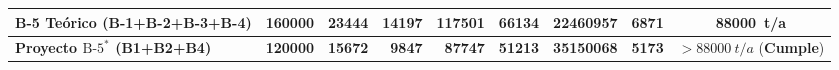 \documentclass{report}
\begin{document}
\begin{table}[H]
{\begin{tabular}{l r r r r r r r c}
            B-5 Teórico (B-1+B-2+B-3+B-4)         & \num{160000}           & \num{23444}           & \num{14197}                 & \num{117501}               & \num{66134}                  & \num{22460957}                   & \num{6871}               & \SI{88000}{t/a}                  \\
            \midrule
            \textbf{Proyecto $\text{B-5}^*$ (B1+B2+B4)} & \textbf{\num{120000}} & \textbf{\num{15672}} & \textbf{\num{9847}}         & \textbf{\num{87747}}       & \textbf{\num{51213}}         & \textbf{\num{35150068}}          & \textbf{\num{5173}}      & $> \SI{88000}{t/a}$ (\textbf{Cumple}) \\
            \bottomrule
        \end{tabular}%
    }
    \label{tab:escenarios_jafari}
\end{table}
\end{document}
